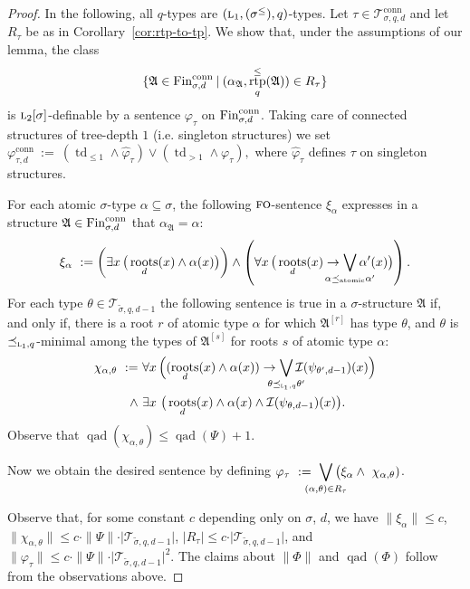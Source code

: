 \documentclass[11pt]{article}
\renewcommand{\phi}{\varphi}
\newcommand{\fin}{\textup{Fin}}
\newcommand{\conn}{\text{conn}}
\newcommand{\logic}[1]{\textsc{#1}}
\newcommand{\logl}{\logic{l}}
\newcommand{\FO}{\logic{fo}}
\newcommand{\types}[1][\sigma,q,d]{\mathcal{T}_{#1}}
\newcommand{\ctypes}[1][\sigma,q,d]{\mathcal{T}^{\conn}_{#1}}
\newcommand{\atleq}{\preceq_{\text{atomic}}}
\newcommand{\size}[1]{\|#1\|}
\newcommand{\qad}[1]{\operatorname{qad}(#1)}
\newcommand{\st}{\mathbin |}
\newcommand{\absval}[1]{\vert #1 \vert}
\newcommand{\limplies}{\rightarrow}
\newcommand{\biglor}{\bigvee}
\newcommand{\leqsym}{\logic{\ensuremath{\leq}}}
\newcommand{\I}{\mathcal{I}}
\DeclareMathOperator{\rtp}{rtp}
\newcommand{\struct}[1]{\mathfrak{#1}}
\newcommand{\AS}{\struct{A}}
\newcommand{\td}{\operatorname{td}}
\DeclareMathOperator{\tdroot}{roots}
\newcommand{\setc}[2]{\{#1 \st #2\}}
\begin{document}
\begin{proof}
  In the following, all $q$-types are
  $(\logl_1,(\sigma^{\leq}),q)$-types.  Let
  $\tau\in\ctypes[\sigma,q,d]$ and let $R_\tau$ be as in
  Corollary~\ref{cor:rtp-to-tp}. We show that, under the assumptions
  of our lemma, the class
  \[ \setc{\AS\in\fin^{\conn}_{\sigma,d}}{(\alpha_\AS,
    \rtp_q^\leqsym(\AS)) \in R_{\tau}}\] is
  $\logl_2[\sigma]$-definable by a sentence $\phi_\tau$ on
  $\fin^{\conn}_{\sigma,d}$. Taking care of connected structures of
  tree-depth $1$ (i.e. singleton structures) we set
  $
  \phi^{\conn}_{\tau,d}\ :=\ (\td_{\leq 1}\land \hat\phi_{\tau}) \lor
  (\td_{> 1} \land \phi_\tau),
  $
  where $\hat\phi_\tau$ defines $\tau$ on singleton structures.

  For each atomic $\sigma$-type $\alpha\subseteq\sigma$, the following
  $\FO$-sentence $\xi_\alpha$ expresses in a structure
  $\AS\in\fin^{\conn}_{\sigma,d}$ that $\alpha_\AS=\alpha$:
  \[ \xi_\alpha\ := \left(\exists x\,\big(\tdroot_d(x) \wedge \alpha(x)\big)
    \right) \wedge \left(\forall x\, \big(\tdroot_d(x)
  \limplies \smashoperator{\biglor_{\alpha \atleq \alpha'}}
  \alpha'(x)\big)\right).
  \]
  For each type $\theta\in\types[\tilde \sigma, q,d-1]$ the following sentence
  is true in a $\sigma$-structure $\AS$ if, and only if, there is a root $r$ of
  atomic type $\alpha$ for which $\AS^{[r]}$ has type $\theta$, and $\theta$ is
  $\preceq_{\logl_1,q}$-minimal among the types of $\AS^{[s]}$ for roots $s$ of
  atomic type $\alpha$:
  \begin{align*}
    \chi_{\alpha,\theta}\ :=\ &\forall x\,\Big(
  (\tdroot_d(x) \land \alpha(x)) \limplies
  \smashoperator{\biglor_{\theta \preceq_{\logl_1,q} \theta'}}
  \I(\psi_{\theta',d-1})(x)\Big)\\
   \land\  &\exists x\ \big(\tdroot_d(x) \land \alpha(x) \land \I(\psi_{\theta,d-1})(x)\big).
  \end{align*}
  Observe that $\qad{\chi_{\alpha,\theta}} \leq \qad{\Psi} + 1$.
  
  Now we obtain the desired sentence by
  defining $\phi_{\tau}\ :=\
  \smashoperator{\biglor_{(\alpha,\theta)\in R_\tau}}
  \big(\xi_{\alpha} \land \ \chi_{\alpha,\theta})$.

  Observe that, for some constant $c$ depending only on $\sigma$, $d$, we have
  $\size{\xi_\alpha} \leq c$, $\size{\chi_{\alpha,\theta}} \leq c \cdot
  \size{\Psi} \cdot \absval{\types[\tilde \sigma, q,d-1]}$, $\absval{R_\tau}
  \leq c \cdot \absval{\types[\tilde \sigma, q,d-1]}$, and  
  $\size{\phi_\tau} \leq c \cdot \size{\Psi} \cdot \absval{\types[\tilde
    \sigma, q,d-1]}^2$.
  The claims about $\size{\Phi}$ and $\qad{\Phi}$ follow from the observations above. 
\end{proof}
\end{document}
